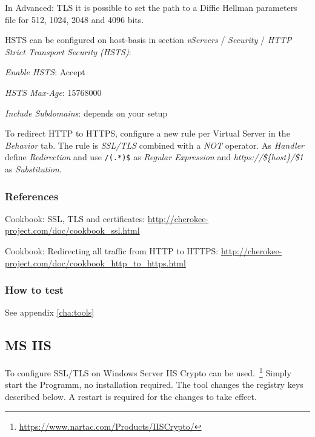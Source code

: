 In Advanced: TLS it is possible to set the path to a Diffie Hellman parameters file for 512, 1024, 2048 and 4096 bits.

HSTS can be configured on host-basis in section \emph{vServers} / \emph{Security} / \emph{HTTP Strict Transport Security (HSTS)}:
\begin{itemize*}
    \item \emph{Enable HSTS}: Accept
    \item \emph{HSTS Max-Age}: 15768000
    \item \emph{Include Subdomains}: depends on your setup
\end{itemize*}

To redirect HTTP to HTTPS, configure a new rule per Virtual Server in the \emph{Behavior} tab. The rule is \emph{SSL/TLS} combined with a \emph{NOT} operator. As \emph{Handler} define \emph{Redirection} and use \texttt{/(.*)\$} as \emph{Regular Expression} and \emph{https://\$\{host\}/\$1} as \emph{Substitution}.


\subsubsection{References}
\begin{itemize*}
  \item Cookbook: SSL, TLS and certificates: \url{http://cherokee-project.com/doc/cookbook_ssl.html}
  \item Cookbook: Redirecting all traffic from HTTP to HTTPS: \url{http://cherokee-project.com/doc/cookbook_http_to_https.html}
\end{itemize*}


\subsubsection{How to test}
See appendix \ref{cha:tools}


\subsection{MS IIS}
\label{sec:ms-iis}

To configure SSL/TLS on Windows Server IIS Crypto can be used.~\footnote{\url{https://www.nartac.com/Products/IISCrypto/}}
Simply start the Programm, no installation required. The tool changes the registry keys described below.
A restart is required for the changes to take effect.

